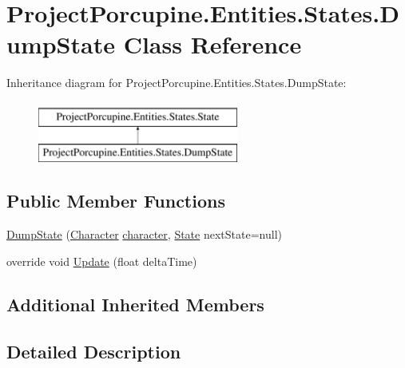 \hypertarget{class_project_porcupine_1_1_entities_1_1_states_1_1_dump_state}{}\section{Project\+Porcupine.\+Entities.\+States.\+Dump\+State Class Reference}
\label{class_project_porcupine_1_1_entities_1_1_states_1_1_dump_state}
Inheritance diagram for Project\+Porcupine.\+Entities.\+States.\+Dump\+State\+:\begin{figure}[H]
\begin{center}
\leavevmode
\includegraphics[height=2.000000cm]{class_project_porcupine_1_1_entities_1_1_states_1_1_dump_state}
\end{center}
\end{figure}
\subsection*{Public Member Functions}
\begin{DoxyCompactItemize}
\item 
\hyperlink{class_project_porcupine_1_1_entities_1_1_states_1_1_dump_state_acbc7fae0a174475774572b270d0a7347}{Dump\+State} (\hyperlink{class_project_porcupine_1_1_entities_1_1_character}{Character} \hyperlink{class_project_porcupine_1_1_entities_1_1_states_1_1_state_a0647dd5dacc8fba22b1c462c954180c7}{character}, \hyperlink{class_project_porcupine_1_1_entities_1_1_states_1_1_state}{State} next\+State=null)
\item 
override void \hyperlink{class_project_porcupine_1_1_entities_1_1_states_1_1_dump_state_a77dc842baa81adec1ae155cdb4c3cf07}{Update} (float delta\+Time)
\end{DoxyCompactItemize}
\subsection*{Additional Inherited Members}


\subsection{Detailed Description}


